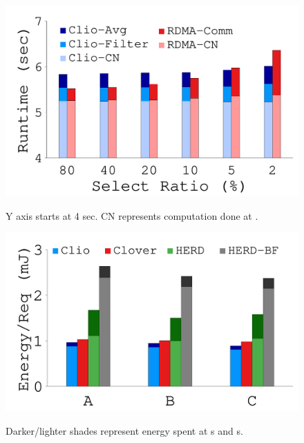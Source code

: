 {
\begin{figure}[th]
\begin{minipage}{\figWidthSix}
\begin{center}
\centerline{\includegraphics[width=\columnwidth]{Figures/g_plot_dp.pdf}}
\vspace{-0.1in}
{
Y axis starts at 4 sec. 
CN represents computation done at \CN.
}
\end{center}
\end{minipage}
\begin{minipage}{0.2in}
\hspace{0.2in}
\end{minipage}
\begin{minipage}{\figWidthSix}
\begin{center}
\centerline{\includegraphics[width=\columnwidth]{Figures/g_plot_ycsb_energy.pdf}}
\vspace{-0.1in}
{
Darker/lighter shades represent energy spent at \MN{}s and \CN{}s.
}
\end{center}
\end{minipage}
\begin{minipage}{0.2in}
\hspace{0.2in}
\end{minipage}
\begin{minipage}{\figWidthSix}
\begin{center}
\scriptsize
\begin{tabular}{ p{0.7in} | p{0.2in} |p{0.27in} }


\end{tabular}
\end{center}
\end{minipage}
\end{figure}}
